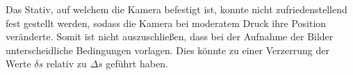 \noindent
Das Stativ, auf welchem die Kamera befestigt ist, konnte nicht zufriedenstellend fest gestellt werden, sodass
die Kamera bei moderatem Druck ihre Position veränderte. Somit ist nicht auszuschließen, dass bei der 
Aufnahme der Bilder unterscheidliche Bedingungen vorlagen. Dies könnte zu einer Verzerrung der Werte 
$\delta s$ relativ zu $\Delta s$ geführt haben.
